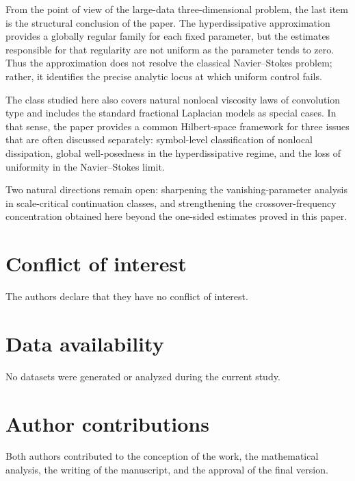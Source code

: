 \documentclass[11pt]{article}
\theoremstyle{definition}
\theoremstyle{remark}
\begin{document}
From the point of view of the large-data three-dimensional problem, the last item is the structural conclusion of the paper. The hyperdissipative approximation provides a globally regular family for each fixed parameter, but the estimates responsible for that regularity are not uniform as the parameter tends to zero. Thus the approximation does not resolve the classical Navier--Stokes problem; rather, it identifies the precise analytic locus at which uniform control fails.

The class studied here also covers natural nonlocal viscosity laws of convolution type and includes the standard fractional Laplacian models as special cases. In that sense, the paper provides a common Hilbert-space framework for three issues that are often discussed separately: symbol-level classification of nonlocal dissipation, global well-posedness in the hyperdissipative regime, and the loss of uniformity in the Navier--Stokes limit.

Two natural directions remain open: sharpening the vanishing-parameter analysis in scale-critical continuation classes, and strengthening the crossover-frequency concentration obtained here beyond the one-sided estimates proved in this paper.

\section*{Conflict of interest}
The authors declare that they have no conflict of interest.

\section*{Data availability}
No datasets were generated or analyzed during the current study.

\section*{Author contributions}
Both authors contributed to the conception of the work, the mathematical analysis, the writing of the manuscript, and the approval of the final version.
\end{document}
